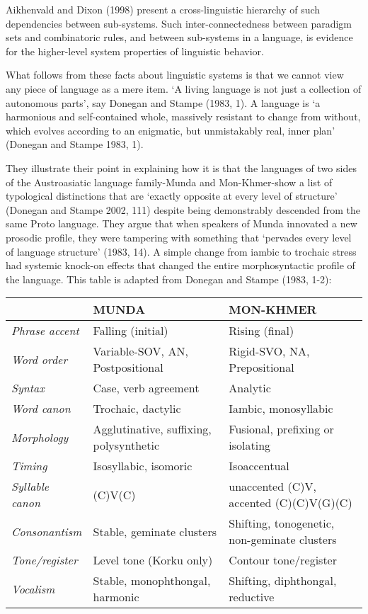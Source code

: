 Aikhenvald and Dixon (1998) present a cross-linguistic hierarchy of such 
dependencies between sub-systems. Such inter-connectedness between 
paradigm sets and combinatoric rules, and between sub-systems in a 
language, is evidence for the higher-level system properties of 
linguistic behavior. 



What follows from these facts about linguistic systems is that we cannot 
view any piece of language as a mere item. \textquoteleft A living language is not 
just a collection of autonomous parts', say Donegan and Stampe (1983, 
1). A language is \textquoteleft a harmonious and self-contained whole, massively 
resistant to change from without, which evolves according to an 
enigmatic, but unmistakably real, inner plan' (Donegan and Stampe 1983, 
1). 



They illustrate their point in explaining how it is that the languages 
of two sides of the Austroasiatic language family-Munda and 
Mon-Khmer-show a list of typological distinctions that are \textquoteleft exactly 
opposite at every level of structure' (Donegan and Stampe 2002, 111) 
despite being demonstrably descended from the same Proto language. They 
argue that when speakers of Munda innovated a new prosodic profile, they 
were tampering with something that \textquoteleft pervades every level of language 
structure' (1983, 14). A simple change from iambic to trochaic stress 
had systemic knock-on effects that changed the entire morphosyntactic 
profile of the language. This table is adapted from Donegan and Stampe 
(1983, 1-2):


\begin{tabularx}{12cm}{|X|X|X|}
\hline
 & MUNDA & MON-KHMER \\
\hline
\textit{Phrase accent} & Falling (initial) & Rising (final) \\
\hline
\textit{Word order} & Variable-SOV, AN, Postpositional & Rigid-SVO, 
NA, Prepositional \\
\hline
\textit{Syntax} & Case, verb agreement & Analytic \\
\hline
\textit{Word canon} & Trochaic, dactylic & Iambic, monosyllabic \\
\hline
\textit{Morphology} & Agglutinative, suffixing, polysynthetic & 
Fusional, prefixing or isolating \\
\hline
\textit{Timing} & Isosyllabic, isomoric & Isoaccentual \\
\hline
\textit{Syllable canon} & (C)V(C) & unaccented (C)V, accented 
(C)(C)V(G)(C) \\
\hline
\textit{Consonantism} & Stable, geminate clusters & Shifting, 
tonogenetic, non-geminate clusters \\
\hline
\textit{Tone/register} & Level tone (Korku only) & Contour 
tone/register \\
\hline
\textit{Vocalism} & Stable, monophthongal, harmonic & Shifting, 
diphthongal, reductive \\
\hline
\end{tabularx}
\newline





